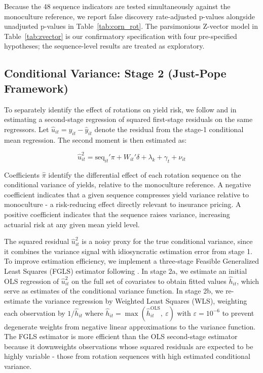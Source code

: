 \documentclass[12pt,letterpaper]{article}
\theoremstyle{remark}
\theoremstyle{remark}
\theoremstyle{plain}
\theoremstyle{definition}
\begin{document}
Because the 48 sequence indicators are tested simultaneously against the monoculture reference, we report \cite{Benjamini1995} false discovery rate-adjusted p-values alongside unadjusted p-values in Table~\ref{tab:corn_rot}. The parsimonious Z-vector model in Table~\ref{tab:zvector} is our confirmatory specification with four pre-specified hypotheses; the sequence-level results are treated as exploratory.

\subsection{\label{subsec:stage_2}Conditional Variance: Stage 2 (Just-Pope Framework)}

To separately identify the effect of rotations on yield risk, we follow \cite{Just1979} and \cite{antle1983} in estimating a second-stage regression of squared first-stage residuals on the same regressors. Let $\hat{u}_{it} = y_{it}-\hat{y}_{it}$ denote
the residual from the stage-1 conditional mean regression. The second moment is then estimated as:

\begin{equation}
    \hat{u}_{it}^2 = \text{seq}_{it}'\pi + W_{it}'\delta + \lambda_k + \gamma_t + \nu_{it}\label{eq:stage2}
\end{equation}

Coefficients $\hat{\pi}$ identify the differential effect of each rotation sequence on the conditional variance of yields, relative to the monoculture reference. A negative coefficient indicates that a given sequence compresses yield variance relative to monoculture - a risk-reducing effect directly relevant to insurance pricing. A positive coefficient indicates that the sequence raises variance, increasing actuarial risk at any given mean yield level.

The squared residual $\hat{u}_{it}^2$ is a noisy proxy for the true conditional variance, since it combines the variance signal with idiosyncratic estimation error from stage 1. To improve estimation efficiency, we implement a three-stage Feasible Generalized Least Squares (FGLS) estimator following \cite{Harvey1976}. In stage 2a, we estimate an initial OLS regression of $\hat{u}_{it}^2$ on the full set of covariates to obtain fitted values $\hat{h}_{it}$, which serve as estimates of the conditional variance function. In stage 2b, we re-estimate the variance regression by Weighted Least Squares (WLS), weighting each observation by $1/\hat{h}_{it}$ where $\hat{h}_{it}= \max(\hat{h}_{it}^{\text{OLS}},\ \varepsilon)$ with $\varepsilon = 10^{-6}$ to prevent degenerate weights from negative linear approximations to the variance function. The FGLS estimator is more efficient than the OLS second-stage estimator because it downweights observations whose squared residuals are expected to be highly variable - those from rotation sequences with high estimated conditional variance.
\end{document}
